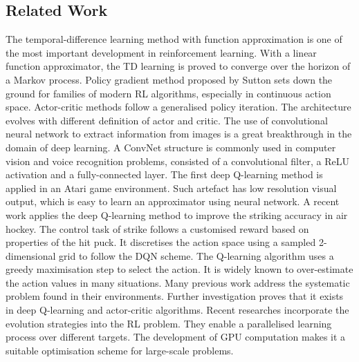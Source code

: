 \documentclass[oneside,11pt,a4paper]{article}
\begin{document}
\subsection{Related Work}
The temporal-difference learning method with function approximation is one of the most important development in reinforcement learning. With a linear function approximator, the TD learning is proved to converge over the horizon of a Markov process. Policy gradient method proposed by Sutton sets down the ground for families of modern RL algorithms, especially in continuous action space. Actor-critic methods follow a generalised policy iteration. The architecture evolves with different definition of actor and critic.
\newline
\newline
\noindent
The use of convolutional neural network to extract information from images is a great breakthrough in the domain of deep learning. A ConvNet structure is commonly used in computer vision and voice recognition problems, consisted of a convolutional filter, a ReLU activation and a fully-connected layer. The first deep Q-learning method is applied in an Atari game environment. Such artefact has low resolution visual output, which is easy to learn an approximator using neural network.
\newline
\newline
\noindent
A recent work applies the deep Q-learning method to improve the striking accuracy in air hockey. \cite{puck} The control task of strike follows a customised reward based on properties of the hit puck. It discretises the action space using a sampled 2-dimensional grid to follow the DQN scheme.\cite{atari}
\newline
\newline
\noindent
The Q-learning algorithm uses a greedy maximisation step to select the action. It is widely known to over-estimate the action values in many situations. Many previous work address the systematic problem found in their environments. Further investigation proves that it exists in deep Q-learning and actor-critic algorithms. \cite{ac}
\newline
\newline
\noindent
Recent researches incorporate the evolution strategies \cite{es}into the RL problem. They enable a parallelised learning process over different targets. The development of GPU computation makes it a suitable optimisation scheme for large-scale problems.
\newline
\newline
\noindent
\end{document}
